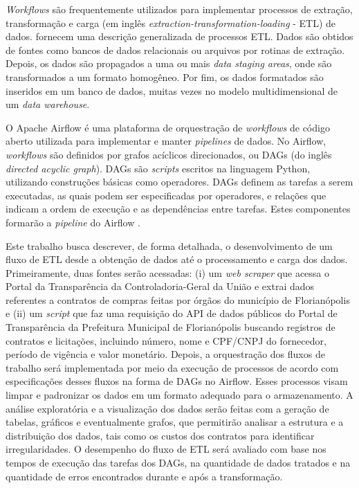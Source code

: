 \textit{Workflows} são frequentemente utilizados para implementar processos de extração, transformação e carga (em inglês \textit{extraction-transformation-loading} - ETL) de dados. \cite{vassiliadis2002conceptual} fornecem uma descrição generalizada de processos ETL. Dados são obtidos de fontes como bancos de dados relacionais ou arquivos por rotinas de extração. Depois, os dados são propagados a uma ou mais \textit{data staging areas}, onde são transformados a um formato homogêneo. Por fim, os dados formatados são inseridos em um banco de dados, muitas vezes no modelo multidimensional de um \textit{data warehouse}.

O Apache Airflow é uma plataforma de orquestração de \textit{workflows} de código aberto utilizada para implementar e manter \textit{pipelines} de dados. No Airflow, \textit{workflows} são definidos por grafos acíclicos direcionados, ou DAGs (do inglês \textit{directed acyclic graph}). DAGs são \textit{scripts} escritos na linguagem Python, utilizando construções básicas como operadores. DAGs definem as tarefas a serem executadas, as quais podem ser especificadas por operadores, e relações que indicam a ordem de execução e as dependências entre tarefas. Estes componentes formarão a \textit{pipeline} do Airflow \cite{finnigan2021building}.

Este trabalho busca descrever, de forma detalhada, o desenvolvimento de um fluxo de ETL desde a obtenção de dados até o processamento e carga dos dados. Primeiramente, duas fontes serão acessadas: (i) um \textit{web scraper} que acessa o Portal da Transparência da Controladoria-Geral da União e extrai dados referentes a contratos de compras feitas por órgãos do município de Florianópolis e (ii) um \textit{script} que faz uma requisição do API de dados públicos do Portal de Transparência da Prefeitura Municipal de Florianópolis buscando registros de contratos e licitações, incluindo número, nome e CPF/CNPJ do fornecedor, período de vigência e valor monetário. Depois, a orquestração dos fluxos de trabalho será implementada por meio da execução de processos de acordo com especificações desses fluxos na forma de DAGs no Airflow. Esses processos visam limpar e padronizar os dados em
um formato adequado para o armazenamento. A análise exploratória e a visualização dos dados serão feitas com a geração de tabelas, gráficos e eventualmente grafos, que permitirão analisar a estrutura e a distribuição dos dados, tais como os custos dos contratos para identificar irregularidades. O desempenho do fluxo de ETL será avaliado com base nos tempos de execução das tarefas dos DAGs, na quantidade de dados tratados e na quantidade de erros encontrados durante e após a transformação.

